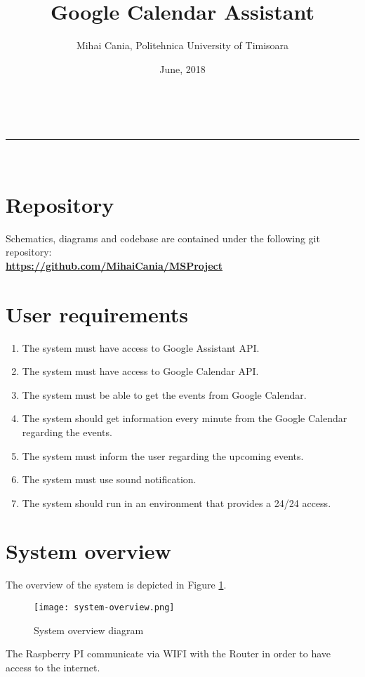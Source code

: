 \documentclass[a4paper,11pt]{article}
\makeatletter
\newcommand{\divider}{\rule{\linewidth}{0.5pt}}
\renewcommand{\maketitle}{
\begin{center}
\vspace{2ex}
{\huge \textsc{\@title}}
\vspace{1ex}
\\
\divider\\
\@author \hfill \@date
\vspace{4ex}
\end{center}
}
\makeatother
\begin{document}
\title{Google Calendar Assistant}

\author{Mihai Cania, Politehnica University of Timisoara}

\date{June, 2018}

\maketitle


\section{Repository}
Schematics, diagrams and codebase are contained under the following git repository:\\
\textbf{\url{https://github.com/MihaiCania/MSProject}}

\section{User requirements}

\begin{enumerate}  
\item The system must have access to Google Assistant API.
\item The system must have access to Google Calendar API.
\item The system must be able to get the events from Google Calendar.
\item The system should get information every minute from the Google Calendar regarding the events.
\item The system must inform the user regarding the upcoming events.
\item The system must use sound notification.
\item The system should run in an environment that provides a 24/24 access.
\end{enumerate}

\section{System overview}

The overview of the system is depicted in Figure \ref{fig:system}.

\begin{figure}[h]
\centering
\texttt{[image: system-overview.png]}
\caption{System overview diagram}
\label{fig:system}
\end{figure}

The Raspberry PI communicate via WIFI with the Router in order to have access to the internet.\\
\end{document}
